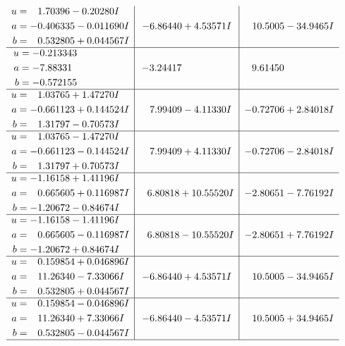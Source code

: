 \documentclass[1p]{elsarticle_modified}
\theoremstyle{definition}
\begin{document}
$$\begin{array}{c|c|c}
\begin{aligned}
u &= \phantom{-}1.70396 - 0.20280 I \\
a &= -0.406335 - 0.011690 I \\
b &= \phantom{-}0.532805 + 0.044567 I\end{aligned}
 & -6.86440 + 4.53571 I & \phantom{-}10.5005 - 34.9465 I \\ \hline\begin{aligned}
u &= -0.213343\phantom{ +0.000000I} \\
a &= -7.88331\phantom{ +0.000000I} \\
b &= -0.572155\phantom{ +0.000000I}\end{aligned}
 & -3.24417\phantom{ +0.000000I} & \phantom{-}9.61450\phantom{ +0.000000I} \\ \hline\begin{aligned}
u &= \phantom{-}1.03765 + 1.47270 I \\
a &= -0.661123 + 0.144524 I \\
b &= \phantom{-}1.31797 - 0.70573 I\end{aligned}
 & \phantom{-}7.99409 - 4.11330 I & -0.72706 + 2.84018 I \\ \hline\begin{aligned}
u &= \phantom{-}1.03765 - 1.47270 I \\
a &= -0.661123 - 0.144524 I \\
b &= \phantom{-}1.31797 + 0.70573 I\end{aligned}
 & \phantom{-}7.99409 + 4.11330 I & -0.72706 - 2.84018 I \\ \hline\begin{aligned}
u &= -1.16158 + 1.41196 I \\
a &= \phantom{-}0.665605 + 0.116987 I \\
b &= -1.20672 - 0.84674 I\end{aligned}
 & \phantom{-}6.80818 + 10.55520 I & -2.80651 - 7.76192 I \\ \hline\begin{aligned}
u &= -1.16158 - 1.41196 I \\
a &= \phantom{-}0.665605 - 0.116987 I \\
b &= -1.20672 + 0.84674 I\end{aligned}
 & \phantom{-}6.80818 - 10.55520 I & -2.80651 + 7.76192 I \\ \hline\begin{aligned}
u &= \phantom{-}0.159854 + 0.046896 I \\
a &= \phantom{-}11.26340 - 7.33066 I \\
b &= \phantom{-}0.532805 + 0.044567 I\end{aligned}
 & -6.86440 + 4.53571 I & \phantom{-}10.5005 - 34.9465 I \\ \hline\begin{aligned}
u &= \phantom{-}0.159854 - 0.046896 I \\
a &= \phantom{-}11.26340 + 7.33066 I \\
b &= \phantom{-}0.532805 - 0.044567 I\end{aligned}
 & -6.86440 - 4.53571 I & \phantom{-}10.5005 + 34.9465 I\\
 \hline 
 \end{array}$$\newpage\newpage\renewcommand{\arraystretch}{1}
\end{document}
